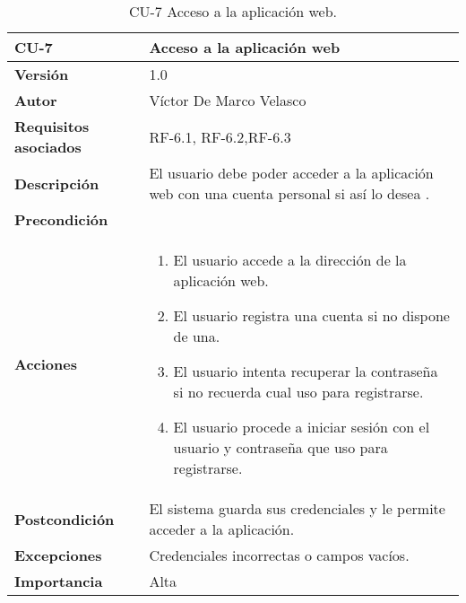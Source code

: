 \begin{table}[p]
	\centering
	\begin{tabularx}{\linewidth}{ p{} p{} }
		\toprule
		\textbf{CU-7}    & Acceso a la aplicación web \\
		\toprule
		\textbf{Versión}              & 1.0 \\
		\textbf{Autor}                & Víctor De Marco Velasco \\
		\textbf{Requisitos asociados} & RF-6.1, RF-6.2,RF-6.3 \\
		\textbf{Descripción}          & El usuario debe poder acceder a la aplicación web con una cuenta personal si así lo desea . \\
		\textbf{Precondición}         & \\
		\textbf{Acciones}             &
		\begin{enumerate}
			\item El usuario accede a la dirección de la aplicación web.
			\item El usuario registra una cuenta si no dispone de una.
			\item El usuario intenta recuperar la contraseña si no recuerda cual uso para registrarse.
			\item El usuario procede a iniciar sesión con el usuario y contraseña que uso para registrarse.
		\end{enumerate}\\
		\textbf{Postcondición}        & El sistema guarda sus credenciales y le permite acceder a la aplicación. \\
		\textbf{Excepciones}          & Credenciales incorrectas o campos vacíos. \\
		\textbf{Importancia}          & Alta \\
		\bottomrule
	\end{tabularx}
	\caption{CU-7 Acceso a la aplicación web.}
\end{table}